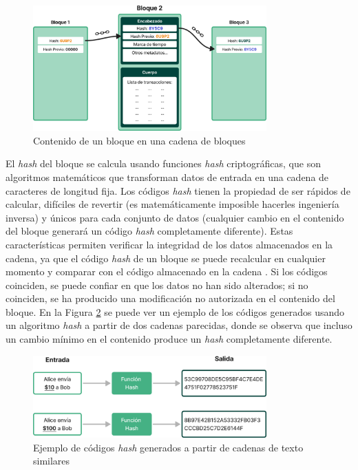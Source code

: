 \begin{figure}[!b]
    \centering
    \includegraphics[width=0.8\textwidth]{Figures/block-structure.png}
    \caption{Contenido de un bloque en una cadena de bloques}
    \label{fig:block-structure}
\end{figure}

El \textit{hash} del bloque se calcula usando funciones \textit{hash} criptográficas, que son algoritmos matemáticos que transforman datos de entrada en una cadena de caracteres de longitud fija. Los códigos \textit{hash} tienen la propiedad de ser rápidos de calcular, difíciles de revertir (es matemáticamente imposible hacerles ingeniería inversa) y únicos para cada conjunto de datos (cualquier cambio en el contenido del bloque generará un código \textit{hash} completamente diferente). Estas características permiten verificar la integridad de los datos almacenados en la cadena, ya que el código \textit{hash} de un bloque se puede recalcular en cualquier momento y comparar con el código almacenado en la cadena \cite{satoshi2008bitcoin}. Si los códigos coinciden, se puede confiar en que los datos no han sido alterados; si no coinciden, se ha producido una modificación no autorizada en el contenido del bloque. En la Figura \ref{fig:hash-example} se puede ver un ejemplo de los códigos generados usando un algoritmo \textit{hash} a partir de dos cadenas parecidas, donde se observa que incluso un cambio mínimo en el contenido produce un \textit{hash} completamente diferente. 

\begin{figure}[!tb]
    \centering
    \includegraphics[width=0.8\textwidth]{Figures/hash-example.png}
    \caption{Ejemplo de códigos \textit{hash} generados a partir de cadenas de texto similares}
    \label{fig:hash-example}
\end{figure}

